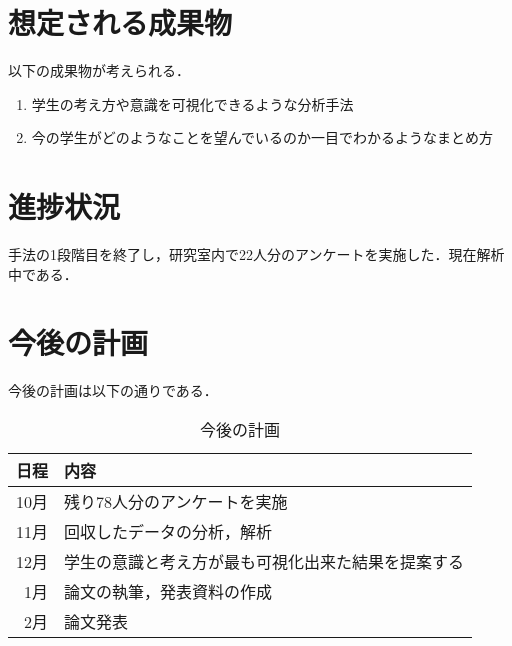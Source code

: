\documentclass[uplatex,twocolumn,dvipdfmx]{jsarticle}
\begin{document}
\section{想定される成果物}
以下の成果物が考えられる．
\begin{enumerate}
\item 学生の考え方や意識を可視化できるような分析手法
\item 今の学生がどのようなことを望んでいるのか一目でわかるようなまとめ方
\end{enumerate}

\section{進捗状況}
手法の1段階目を終了し，研究室内で22人分のアンケートを実施した．現在解析中である．
\section{今後の計画}

今後の計画は以下の通りである．
\begin{table}[hbtp]
  \caption{今後の計画}
  \label{table:data_type}
  \centering
  \begin{tabular}{rl}
    \hline
    日程 & 内容  \\ \hline \hline
    10月 & 残り78人分のアンケートを実施 \\
    11月 & 回収したデータの分析，解析 \\
    12月 & 学生の意識と考え方が最も可視化出来た結果を提案する \\
    1月 & 論文の執筆，発表資料の作成 \\
2月 & 論文発表\\
 \hline
  \end{tabular}
\end{table}



\end{document}

